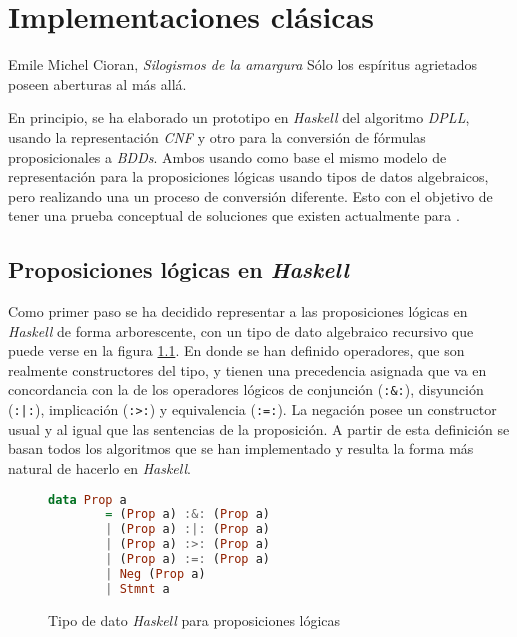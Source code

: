 \chapter{Implementaciones clásicas}

\begin{chapquote}{Emile Michel Cioran, \textit{Silogismos de la amargura}}
Sólo los espíritus agrietados poseen aberturas al más allá.
\end{chapquote}

En principio, se ha elaborado un prototipo en \textit{Haskell} del algoritmo \textit{DPLL}, usando la representación \textit{CNF} y otro para la conversión de fórmulas proposicionales a \textit{BDDs}. Ambos usando como base el mismo modelo de representación para la proposiciones lógicas usando tipos de datos algebraicos, pero realizando una un proceso de conversión diferente. Esto con el objetivo de tener una prueba conceptual de soluciones que existen actualmente para \sat.

\section{Proposiciones lógicas en \textit{Haskell}}
\label{sec:data}

Como primer paso se ha decidido representar a las proposiciones lógicas en \textit{Haskell} de forma arborescente, con un tipo de dato algebraico recursivo que puede verse en la figura \ref{code:prop}. En donde se han definido operadores, que son realmente constructores del tipo, y tienen una precedencia asignada que va en concordancia con la de los operadores lógicos de conjunción (\texttt{:\&:}), disyunción (\texttt{:|:}), implicación (\texttt{:>:}) y equivalencia (\texttt{:=:}). La negación posee un constructor usual y al igual que las sentencias de la proposición. A partir de esta definición se basan todos los algoritmos que se han implementado y resulta la forma más natural de hacerlo en \textit{Haskell}.

\begin{figure}
\begin{lstlisting}[language=Haskell]
    data Prop a
        = (Prop a) :&: (Prop a)
        | (Prop a) :|: (Prop a)
        | (Prop a) :>: (Prop a)
        | (Prop a) :=: (Prop a)
        | Neg (Prop a)
        | Stmnt a
\end{lstlisting}
\caption{Tipo de dato \textit{Haskell} para proposiciones lógicas}
\label{code:prop}
\end{figure}

